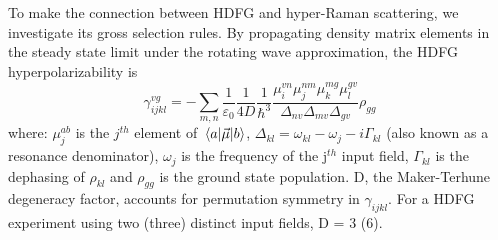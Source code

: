 \documentclass[aip, jcp, reprint, onecolumn]{revtex4-2}
\begin{document}
To make the connection between HDFG and hyper-Raman scattering, we investigate its gross selection rules.
By propagating density matrix elements in the steady state limit under the rotating wave approximation, the HDFG hyperpolarizability is \cite{RN133}
\begin{equation}\label{sivegamma}
		\gamma_{ijkl}^{vg} =	- \sum_{m, n} \frac{1}{\varepsilon_0} \frac{1}{4D} \frac{1}{\hbar^3} \frac{\mu^{vn}_{i} \mu^{nm}_{j} \mu^{mg}_{k} \mu^{gv}_{l} }{\Delta_{nv} \Delta_{mv}\Delta_{gv}}  \rho_{gg}
\end{equation}
where: $\mu^{ab}_{j}$ is the $j^{th}$ element of $\mel{a}{\vec{\mu}}{b}$, $\Delta_{kl} = \omega_{kl} - \omega_{j} - i\Gamma_{kl}$ (also known as a resonance denominator), $\omega_j$ is the frequency of the j$^{th}$ input field, $\Gamma_{kl}$ is the dephasing of $\rho_{kl}$ and $\rho_{gg}$ is the ground state population.
D, the Maker-Terhune degeneracy factor, accounts for permutation symmetry in $\gamma_{ijkl}$.\cite{RN134} 
For a HDFG experiment using two (three) distinct input fields, D = 3 (6).
\end{document}

